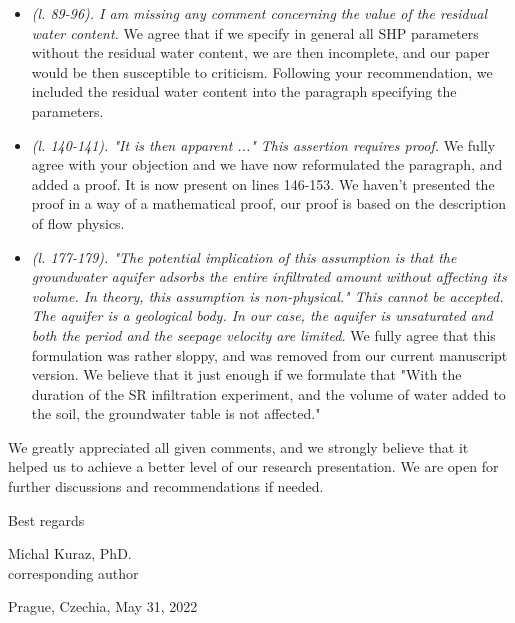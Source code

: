 \documentclass[a4paper,12pt]{letter}
\begin{document}
\begin{itemize}
  \item {\it  (l. 89-96). I am missing any comment concerning the value of the
  residual water content.} We agree that if we specify in general all SHP parameters  without the residual water content, we are then incomplete, and our paper would be then susceptible to criticism. Following your recommendation, we included the residual water content into the  paragraph specifying the parameters.
  \item {\it (l. 140-141). "It is then apparent ..." This assertion requires
  proof.} We fully agree with your objection and we have now reformulated the paragraph, and added a proof. It is now present on lines 146-153. We haven't presented the proof in a way of a mathematical proof, our proof is based on the description of flow physics.
  \item {\it (l. 177-179). "The potential implication of this assumption is that
  the groundwater aquifer adsorbs the entire infiltrated amount without
  affecting its volume. In theory, this assumption is non-physical."
  This cannot be accepted. The aquifer is a geological body. In our
  case, the aquifer is unsaturated and both the period and the seepage
  velocity are limited.} We fully agree that this formulation was rather sloppy, and was removed from our current manuscript version. We believe that it just enough if we formulate that "With the duration of the SR infiltration experiment, and the volume of water added to the soil, the groundwater table is not affected."
  \end{itemize}
  
  We greatly appreciated all given comments, and we strongly believe that it helped us to achieve a better level of our research presentation. We are open for further discussions and recommendations if needed.
  
  \begin{center} 
  
  Best regards
  \end{center}
  
  \flushright Michal Kuraz, PhD. \\
 corresponding author
  
  \flushleft
  Prague, Czechia, May 31, 2022
  
\end{document}
